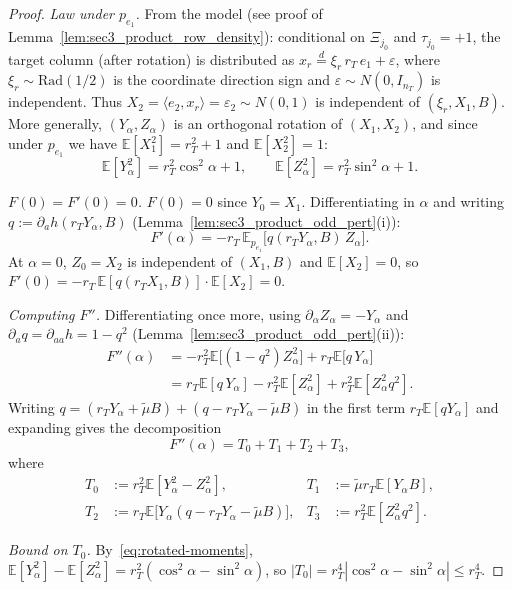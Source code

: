 \documentclass[10pt,a4paper]{amsart}
\newcommand{\Ebb}{\mathbb E}
\newcommand{\ip}[2]{\langle #1,#2\rangle}
\newcommand{\nT}{n_{\trg}}
\newcommand{\trg}{T}
\begin{document}
\begin{proof}
\textit{Law under $p_{e_1}$.}
From the model (see proof of Lemma~\ref{lem:sec3_product_row_density}):
conditional on $\Xi_{j_0}$ and $\tau_{j_0}=+1$, the target column (after rotation) is distributed as
$x_r \overset{d}{=} \xi_r\,r_T\,e_1+\varepsilon$, where $\xi_r\sim\mathrm{Rad}(1/2)$
is the coordinate direction sign and $\varepsilon\sim N(0,I_{\nT})$ is independent.
Thus $X_2=\ip{e_2}{x_r}=\varepsilon_2\sim N(0,1)$ is independent of $(\xi_r,X_1,B)$.
More generally, $(Y_\alpha,Z_\alpha)$ is an orthogonal rotation of $(X_1,X_2)$, and
since under $p_{e_1}$ we have $\Ebb[X_1^2]=r_T^2+1$ and $\Ebb[X_2^2]=1$:
\begin{equation}\label{eq:rotated-moments}
    \Ebb[Y_\alpha^2]=r_T^2\cos^2\alpha+1, \qquad \Ebb[Z_\alpha^2]=r_T^2\sin^2\alpha+1.
\end{equation}

\textit{$F(0)=F'(0)=0$.}
$F(0)=0$ since $Y_0=X_1$.  Differentiating in $\alpha$ and writing
$q:=\partial_a h(r_T Y_\alpha,B)$ (Lemma~\ref{lem:sec3_product_odd_pert}(i)):
\[
    F'(\alpha) = -r_T\,\Ebb_{p_{e_1}}\!\bigl[q(r_T Y_\alpha,B)\,Z_\alpha\bigr].
\]
At $\alpha=0$, $Z_0=X_2$ is independent of $(X_1,B)$ and $\Ebb[X_2]=0$,
so $F'(0)=-r_T\,\Ebb[q(r_T X_1,B)]\cdot\Ebb[X_2]=0$.

\textit{Computing $F''$.}
Differentiating once more, using $\partial_\alpha Z_\alpha=-Y_\alpha$ and
$\partial_a q=\partial_{aa}h=1-q^2$ (Lemma~\ref{lem:sec3_product_odd_pert}(ii)):
\begin{align*}
    F''(\alpha)
    &=
    -r_T^2\Ebb\!\bigl[(1-q^2)Z_\alpha^2\bigr]
    +
    r_T\Ebb\!\bigl[q\,Y_\alpha\bigr]\\
    &=
    r_T\Ebb[q\,Y_\alpha]
    -r_T^2\Ebb[Z_\alpha^2]
    +r_T^2\Ebb[Z_\alpha^2 q^2].
\end{align*}
Writing $q = (r_T Y_\alpha+\tilde\mu B)+(q-r_T Y_\alpha-\tilde\mu B)$
in the first term $r_T\Ebb[qY_\alpha]$ and expanding gives the decomposition
\[
    F''(\alpha) = T_0+T_1+T_2+T_3,
\]
where
\begin{align*}
    T_0 &:= r_T^2\Ebb[Y_\alpha^2-Z_\alpha^2], &
    T_1 &:= \tilde\mu r_T\Ebb[Y_\alpha B], \\
    T_2 &:= r_T\Ebb\!\bigl[Y_\alpha(q-r_T Y_\alpha-\tilde\mu B)\bigr], &
    T_3 &:= r_T^2\Ebb[Z_\alpha^2 q^2].
\end{align*}

\textit{Bound on $T_0$.}
By~\eqref{eq:rotated-moments},
$\Ebb[Y_\alpha^2]-\Ebb[Z_\alpha^2]=r_T^2(\cos^2\alpha-\sin^2\alpha)$,
so $|T_0|=r_T^4|\cos^2\alpha-\sin^2\alpha|\le r_T^4$.


\end{proof}
\end{document}
